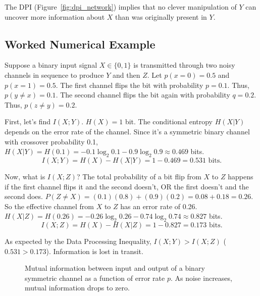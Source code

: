 The DPI (Figure~\ref{fig:dpi_network}) implies that no clever manipulation of $Y$ can uncover more information about $X$ than was originally present in $Y$. 

\subsection{Worked Numerical Example}

Suppose a binary input signal $X \in \{0,1\}$ is transmitted through two noisy channels in sequence to produce $Y$ and then $Z$. 
Let $p(x=0) = 0.5$ and $p(x=1) = 0.5$.
The first channel flips the bit with probability $p=0.1$. Thus, $p(y \neq x) = 0.1$.
The second channel flips the bit again with probability $q=0.2$. Thus, $p(z \neq y) = 0.2$.

First, let's find $I(X; Y)$. 
$H(X) = 1$ bit. 
The conditional entropy $H(X|Y)$ depends on the error rate of the channel. Since it's a symmetric binary channel with crossover probability 0.1, $H(X|Y) = H(0.1) = -0.1\log_2 0.1 - 0.9\log_2 0.9 \approx 0.469$ bits.
\begin{equation*}
    I(X; Y) = H(X) - H(X|Y) = 1 - 0.469 = 0.531 \text{ bits.}
\end{equation*}

Now, what is $I(X; Z)$? 
The total probability of a bit flip from $X$ to $Z$ happens if the first channel flips it and the second doesn't, OR the first doesn't and the second does.
$P(Z \neq X) = (0.1)(0.8) + (0.9)(0.2) = 0.08 + 0.18 = 0.26$.
So the effective channel from $X$ to $Z$ has an error rate of 0.26.
$H(X|Z) = H(0.26) = -0.26\log_2 0.26 - 0.74\log_2 0.74 \approx 0.827$ bits.
\begin{equation*}
    I(X; Z) = H(X) - H(X|Z) = 1 - 0.827 = 0.173 \text{ bits.}
\end{equation*}

As expected by the Data Processing Inequality, $I(X; Y) > I(X; Z)$ ($0.531 > 0.173$). Information is lost in transit.

\begin{figure}[ht]
    \centering
    \caption{Mutual information between input and output of a binary symmetric channel as a function of error rate $p$. As noise increases, mutual information drops to zero.}
    \label{fig:capacity}
\end{figure}


